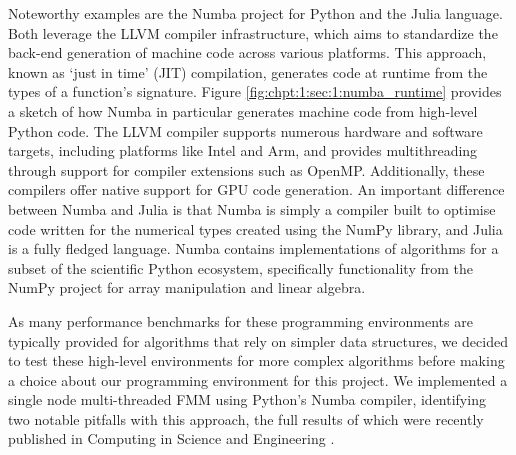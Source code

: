 Noteworthy examples are the Numba project for Python and the Julia language. Both leverage the LLVM compiler infrastructure, which aims to standardize the back-end generation of machine code across various platforms. This approach, known as `just in time' (JIT) compilation, generates code at runtime from the types of a function's signature. Figure \ref{fig:chpt:1:sec:1:numba_runtime} provides a sketch of how Numba in particular generates machine code from high-level Python code. The LLVM compiler supports numerous hardware and software targets, including platforms like Intel and Arm, and provides multithreading through support for compiler extensions such as OpenMP. Additionally, these compilers offer native support for GPU code generation. An important difference between Numba and Julia is that Numba is simply a compiler built to optimise code written for the numerical types created using the NumPy library, and Julia is a fully fledged language. Numba contains implementations of algorithms for a subset of the scientific Python ecosystem, specifically functionality from the NumPy project for array manipulation and linear algebra.


As many performance benchmarks for these programming environments are typically provided for algorithms that rely on simpler data structures, we decided to test these high-level environments for more complex algorithms before making a choice about our programming environment for this project. We implemented a single node multi-threaded FMM using Python's Numba compiler, identifying two notable pitfalls with this approach, the full results of which were recently published in Computing in Science and Engineering \cite{kailasa2022pyexafmm}.

